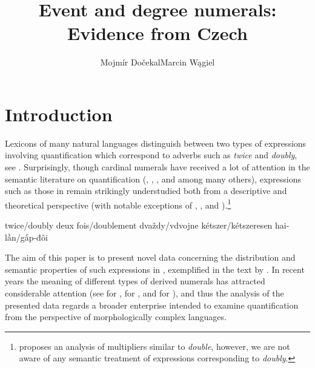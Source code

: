 \documentclass[output=paper,modfonts,hidelinks,newtxmath
\ChapterDOI{10.5281/zenodo.2545513}
]{langscibook}
\title{Event and degree numerals: \newlineCover Evidence from Czech}
\author{Mojmír Dočekal\affiliation{Masaryk University in Brno}\lastand Marcin Wągiel\affiliation{Masaryk University in Brno}}
\begin{document}
\maketitle
{}

\section{Introduction}\label{introduction}
\largerpage[-1.5]
Lexicons of many natural languages distinguish between two types of expressions involving quantification which correspond to  adverbs such as \textit{twice} and \textit{doubly}, see . Surprisingly, though cardinal numerals have received a lot of attention in the semantic literature on quantification (\citealt{landman2004indefinites}, \citealt{ionin_composition_2006}, \citealt{hofweber2005number}, and \citealt{rothstein2012numericals} among many others), expressions such as those in  remain strikingly understudied both from a descriptive and theoretical perspective (with notable exceptions of \citealt{landman_indefinite_2006}, \citealt{bhatt2007degree}, and \citealt{donazzan_ways_2013}).\footnote{\citet{wagiel-toappear-entities} proposes an analysis of   multipliers similar to  \textit{double}, however, we are not aware of any semantic treatment of  expressions corresponding to  \textit{doubly}.}

\ea \label{twice-double-expressions}
\settowidth{}
\ea twice/doubly             
\ex deux fois/doublement 
\ex dvaždy/vdvojne       
\ex kétszer/kétszeresen  
\ex hai-lần/gấp-đôi          
\z
\z

\noindent The aim of this paper is to present novel data concerning the distribution and semantic properties of such expressions in , exemplified in the text by . In recent years the meaning of different types of  derived numerals has attracted considerable attention (see \citealt{docekal2012atoms,docekal2013numerals} for , \citealt{wagiel2014dwoje,wagiel2015sums} for , and \citealt{khrizman2015cardinal} for ), and thus the analysis of the presented data regards a broader enterprise intended to examine  quantification from the perspective of morphologically complex languages.
\end{document}
